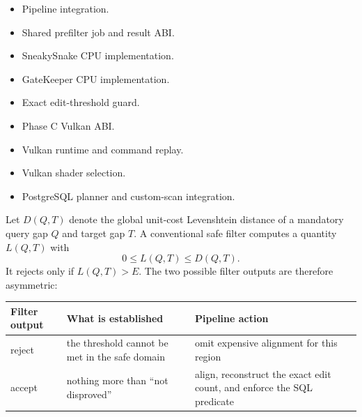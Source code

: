 \begin{itemize}
    \item Pipeline integration.\\
    \item Shared prefilter job and result ABI.\\
    \item SneakySnake CPU implementation.\\
    \item GateKeeper CPU implementation.\\
    \item Exact edit-threshold guard.\\
    \item Phase C Vulkan ABI.\\
    \item Vulkan runtime and command replay.\\
    \item Vulkan shader selection.\\
    \item PostgreSQL planner and custom-scan integration.\\
\end{itemize}

Let \(D(Q,T)\) denote the global unit-cost Levenshtein distance of a mandatory
query gap \(Q\) and target gap \(T\).  A conventional safe filter computes a
quantity \(L(Q,T)\) with
\[
        0 \le L(Q,T) \le D(Q,T).
\]
It rejects only if \(L(Q,T)>E\).  The two possible filter outputs are therefore
asymmetric:

\begin{center}
\begin{tabular}{p{}p{}p{}}
\textbf{Filter output} & \textbf{What is established} & \textbf{Pipeline action}\\
\hline
reject & the threshold cannot be met in the safe domain & omit expensive
alignment for this region\\
accept & nothing more than ``not disproved'' & align, reconstruct the exact
edit count, and enforce the SQL predicate\\
\end{tabular}
\end{center}

